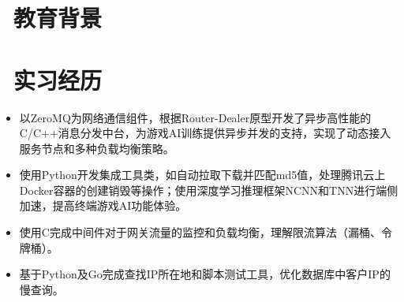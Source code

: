 \documentclass{resume}
\begin{document}
\vspace{-1ex}
 
\section{\faGraduationCap\  教育背景}

\vspace{1ex}


\section{\faSitemap\ 实习经历}
\vspace{-0.5ex}
\begin{onehalfspacing}
\begin{itemize}
  \item 以ZeroMQ为网络通信组件，根据Router-Dealer原型开发了异步高性能的C/C++消息分发中台，为游戏AI训练提供异步并发的支持，实现了动态接入服务节点和多种负载均衡策略。
  \item 使用Python开发集成工具类，如自动拉取下载并匹配md5值，处理腾讯云上Docker容器的创建销毁等操作；使用深度学习推理框架NCNN和TNN进行端侧加速，提高终端游戏AI功能体验。
\end{itemize}
\end{onehalfspacing}

\vspace{-0.5ex}
\begin{onehalfspacing}
\begin{itemize}
  \item 使用C完成中间件对于网关流量的监控和负载均衡，理解限流算法（漏桶、令牌桶）。
  \item 基于Python及Go完成查找IP所在地和脚本测试工具，优化数据库中客户IP的慢查询。
\end{itemize}
\end{onehalfspacing}
\end{document}
